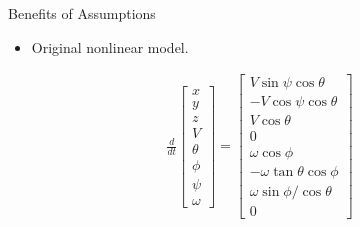 \documentclass[hyperref={pdfpagelabels=false}]{beamer}
\begin{document}
\begin{frame}{Benefits of Assumptions}
\begin{itemize}
\item Original nonlinear model.
\end{itemize}
\begin{align*}
\frac{d}{dt}\left[\begin{array}{c}
x \\ y \\ z \\ V \\ \theta \\ \phi \\ \psi \\ \omega
\end{array}\right] =
\left[\begin{array}{c}
V\sin\psi\cos\theta \\
-V\cos\psi\cos\theta \\
V\cos\theta \\
0 \\
\omega\cos\phi \\
-\omega\tan\theta\cos\phi \\
\omega\sin\phi/\cos\theta \\
0
\end{array}\right]
\end{align*}
\end{frame}
\end{document}
